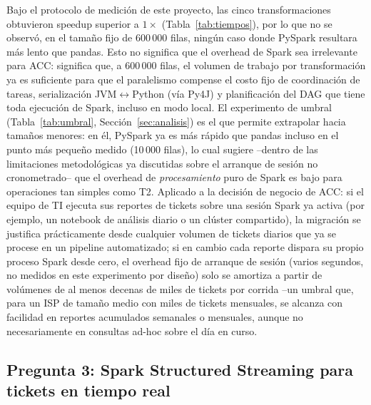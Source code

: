 \documentclass[11pt,a4paper]{article}
\begin{document}
Bajo el protocolo de medici\'on de este proyecto, las cinco transformaciones
obtuvieron speedup superior a $1\times$ (Tabla~\ref{tab:tiempos}), por lo que
no se observ\'o, en el tama\~no fijo de 600\,000 filas, ning\'un caso donde
PySpark resultara m\'as lento que pandas. Esto no significa que el overhead
de Spark sea irrelevante para ACC: significa que, a 600\,000 filas, el
volumen de trabajo por transformaci\'on ya es suficiente para que el
paralelismo compense el costo fijo de coordinaci\'on de tareas, serializaci\'on
JVM$\leftrightarrow$Python (v\'ia Py4J) y planificaci\'on del DAG que tiene
toda ejecuci\'on de Spark, incluso en modo local. El experimento de umbral
(Tabla~\ref{tab:umbral}, Secci\'on~\ref{sec:analisis}) es el que permite
extrapolar hacia tama\~nos menores: en \'el, PySpark ya es m\'as r\'apido que
pandas incluso en el punto m\'as peque\~no medido (10\,000 filas), lo cual
sugiere --dentro de las limitaciones metodol\'ogicas ya discutidas sobre el
arranque de sesi\'on no cronometrado-- que el overhead de \emph{procesamiento}
puro de Spark es bajo para operaciones tan simples como T2. Aplicado a la
decisi\'on de negocio de ACC: si el equipo de TI ejecuta sus reportes de
tickets sobre una sesi\'on Spark ya activa (por ejemplo, un notebook de
an\'alisis diario o un cl\'uster compartido), la migraci\'on se justifica
pr\'acticamente desde cualquier volumen de tickets diarios que ya se procese
en un pipeline automatizado; si en cambio cada reporte dispara su propio
proceso Spark desde cero, el overhead fijo de arranque de sesi\'on (varios
segundos, no medidos en este experimento por dise\~no) solo se amortiza a
partir de vol\'umenes de al menos decenas de miles de tickets por corrida
--un umbral que, para un ISP de tama\~no medio con miles de tickets
mensuales, se alcanza con facilidad en reportes acumulados semanales o
mensuales, aunque no necesariamente en consultas ad-hoc sobre el d\'ia en
curso.

\subsection*{Pregunta 3: Spark Structured Streaming para tickets en tiempo real}
\end{document}
